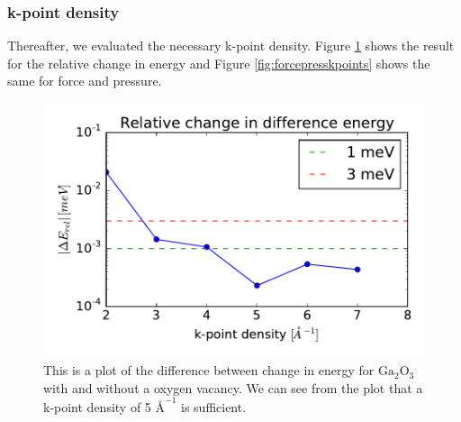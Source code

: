 \subsubsection{k-point density}

Thereafter, we evaluated the necessary k-point density. Figure \ref{fig:totenkpoints} shows the result for the relative change in energy and Figure \ref{fig:forcepresskpoints} shows the same for force and pressure. 

\begin{figure}[H]
\includegraphics[width=\linewidth]{../fig/deltatotencurverel_kpoints.pdf}\caption{This is a plot of the difference between change in energy for $\text{Ga}_2\text{O}_3$ with and without a oxygen vacancy. We can see from the plot that a k-point density of 5 $\text{Å}^{-1}$ is sufficient.}\label{fig:totenkpoints}
\end{figure}

